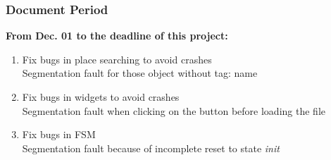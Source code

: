 \documentclass[a4paper, 12pt, english]{book}
\begin{document}
\subsubsection{Document Period}

{\textbf{From Dec. 01 to the deadline of this project:}}
\begin{enumerate}
	\item Fix bugs in place searching to avoid crashes\\
	Segmentation fault for those object without tag: name
	\item Fix bugs in widgets to avoid crashes\\
	Segmentation fault when clicking on the button before loading the file
	\item Fix bugs in FSM\\
	Segmentation fault because of incomplete reset to state {\textit{init}}
\end{enumerate}






\end{document}
